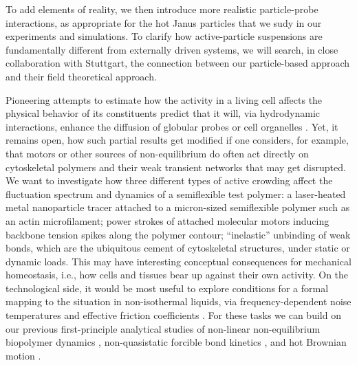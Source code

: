 \begin{workpackage}
\begin{tasklist}
\begin{task}[title=Non-Equilibrium Equations of State (NEOS),id=task1,PM=8,lead=Leipzig,partners={Padova,USTUTT},
wphases=0-48!0.5]
To add elements of reality, we then introduce more realistic particle-probe interactions, as appropriate for the hot 
Janus particles that we sudy in our experiments and simulations.
%
To clarify how active-particle suspensions are fundamentally different from externally driven systems, 
we will search, in close collaboration with Stuttgart, the connection between our particle-based approach 
and their field theoretical approach.

\end{task}

\begin{task}[title=Active Crowding,id=task2,lead=Leipzig,wphases=0-48!0.5]
Pioneering attempts to estimate how the activity in a living cell affects the physical behavior
of its constituents predict that it will, via hydrodynamic interactions, enhance the diffusion of
globular probes or cell organelles \cite{mikhailov-kapral:2015}.
%
Yet, it remains open, how such partial results get modified if one considers, for example, that motors or
other sources of non-equilibrium do often act directly on cytoskeletal polymers and their
weak transient networks that may get disrupted.
%
We want to  investigate how three different types of active
crowding affect the fluctuation spectrum and dynamics of a semiflexible test polymer: a
laser-heated metal nanoparticle tracer attached to a micron-sized semiflexible polymer such
as an actin microfilament; power strokes of attached molecular
motors inducing backbone tension spikes along the polymer contour; ``inelastic'' \cite{gralka-kroy:2015}
unbinding of weak bonds, which are the ubiquitous cement of
cytoskeletal structures, under static or dynamic loads.
%
This may have interesting conceptual consequences for mechanical homeostasis, i.e., how cells and tissues bear up against 
their own activity.   
%
On the technological side, it would be most useful to explore conditions for a formal mapping to the situation in 
non-isothermal liquids, via frequency-dependent noise temperatures and 
effective friction coefficients \cite{falasco-etal:2014}.
%
For these tasks we can build on our previous first-principle analytical studies
of non-linear non-equilibrium biopolymer dynamics \cite{otto-etal:2013}, non-quasistatic forcible 
bond kinetics \cite{bullerjahn-sturm-kroy:2014}, and hot Brownian motion 
\cite{rings-etal:2010,falasco-etal:2014}.

\end{task}



\end{tasklist}
\end{workpackage}
